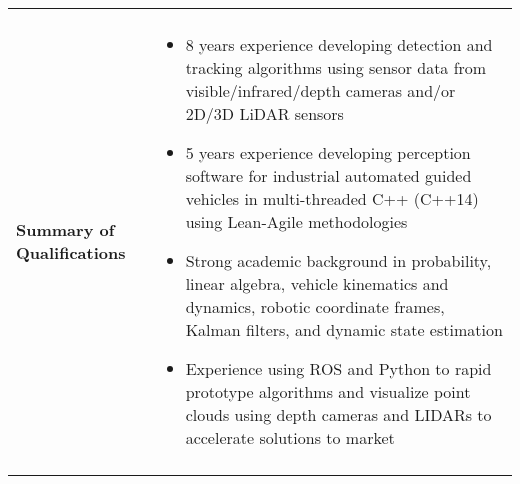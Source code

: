 \begin{tabular}{L{\lcolw}  L{\rcolw}}
 \hline \hline \\
\textbf{\Large Summary of Qualifications} &
\vspace{-0.3in} 
    \begin{itemize}[leftmargin = \itemmargin]

	\item 8 years experience developing detection and tracking algorithms using sensor data from visible/infrared/depth cameras and/or 2D/3D LiDAR sensors 
		
	\item 5 years experience developing perception software for industrial automated guided vehicles in multi-threaded C++ (C++14) using Lean-Agile methodologies
	
	\item Strong academic background in probability, linear algebra, vehicle kinematics and dynamics, robotic coordinate frames, Kalman filters, and dynamic state estimation

	\item Experience using ROS and Python to rapid prototype algorithms and visualize point clouds using depth cameras and LIDARs to accelerate solutions to market
		
	\end{itemize}\\
 \hline \\ 
\end{tabular}